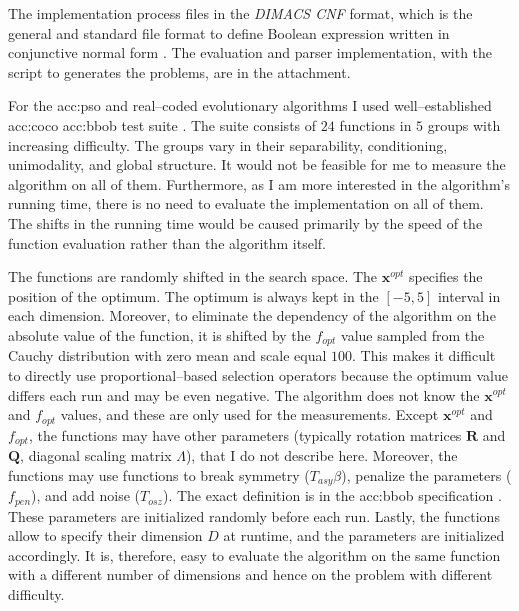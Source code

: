 The implementation process files in the \textit{DIMACS CNF} format, which is the general and standard file format to define Boolean expression written in conjunctive normal form \citep{challenge1993satisfiability}. The evaluation and parser implementation, with the script to generates the problems, are in the attachment.

For the \acrlong{acc:pso} and real--coded evolutionary algorithms I used well--established \acrfull{acc:coco} \acrfull{acc:bbob} test suite \citep{hansen2010comparing}. The suite consists of $24$ functions in $5$ groups with increasing difficulty. The groups vary in their separability, conditioning, unimodality, and global structure. It would not be feasible for me to measure the algorithm on all of them. Furthermore, as I am more interested in the algorithm's running time, there is no need to evaluate the implementation on all of them. The shifts in the running time would be caused primarily by the speed of the function evaluation rather than the algorithm itself.

The functions are randomly shifted in the search space. The $\mathbf{x}^{opt}$ specifies the position of the optimum. The optimum is always kept in the $\left[-5,5\right]$ interval in each dimension. Moreover, to eliminate the dependency of the algorithm on the absolute value of the function, it is shifted by the $f_{opt}$ value sampled from the Cauchy distribution with zero mean and scale equal $100$. This makes it difficult to directly use proportional--based selection operators because the optimum value differs each run and may be even negative. The algorithm does not know the $\mathbf{x}^{opt}$ and $f_{opt}$ values, and these are only used for the measurements. Except $\mathbf{x}^{opt}$ and $f_{opt}$, the functions may have other parameters (typically rotation matrices $\mathbf{R}$ and $\mathbf{Q}$, diagonal scaling matrix $\Lambda$), that I do not describe here. Moreover, the functions may use functions to break symmetry ($T_{asy}\beta$), penalize the parameters ($f_{pen}$), and add noise ($T_{osz}$). The exact definition is in the \acrshort{acc:bbob} specification \citep{hansen2010comparing}. These parameters are initialized randomly before each run. Lastly, the functions allow to specify their dimension $D$ at runtime, and the parameters are initialized accordingly. It is, therefore, easy to evaluate the algorithm on the same function with a different number of dimensions and hence on the problem with different difficulty.

